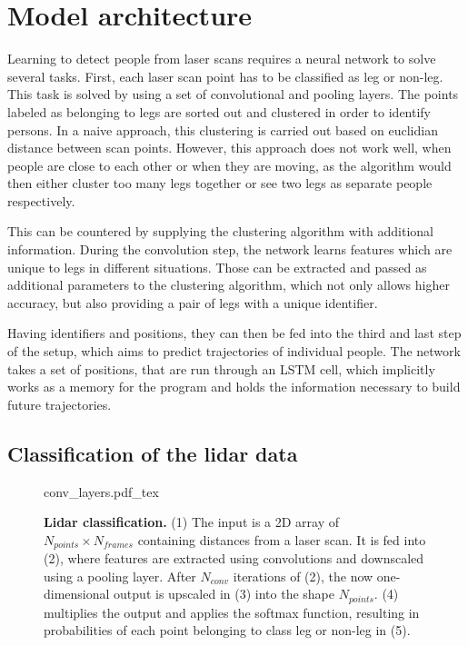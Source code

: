 \section{Model architecture}
\label{sec:model_arch}

\label{sec:Model}

Learning to detect people from laser scans requires a neural network to solve several tasks. 
First, each laser scan point has to be classified as leg or non-leg.
This task is solved by using a set of convolutional and pooling layers. 
The points labeled as belonging to legs are sorted out and clustered in order to identify persons.
In a naive approach, this clustering is carried out based on euclidian distance between scan points.
However, this approach does not work well, when people are close to each other or when they are moving, as the algorithm would then either cluster too many legs together or see two legs as separate people respectively.

This can be countered by supplying the clustering algorithm with additional information.
During the convolution step, the network learns features which are unique to legs in different situations. 
Those can be extracted and passed as additional parameters to the clustering algorithm, which not only allows higher accuracy, but also providing a pair of legs with a unique identifier.

Having identifiers and positions, they can then be fed into the third and last step of the setup, which aims to predict trajectories of individual people. The network takes a set of positions, that are run through an LSTM cell, which implicitly works as a memory for the program and holds the information necessary to build future trajectories.

\subsection{Classification of the lidar data}
\label{sec:classification}

\begin{figure}

\def\svgwidth{0.4 \textwidth}
\small
{conv_layers.pdf_tex}
\caption{\textbf{Lidar classification.} (1) The input is a 2D array of $N_{points} \times N_{frames}$ containing distances from a laser scan. It is fed into (2), where features are extracted using convolutions and downscaled using a pooling layer. After $N_{conv}$ iterations of (2), the now one-dimensional output is upscaled in (3) into the shape $N_{points}$. (4) multiplies the output and applies the softmax function, resulting in probabilities of each point belonging to class leg or non-leg in (5).}
\label{fig:laser_classification}
\end{figure}

